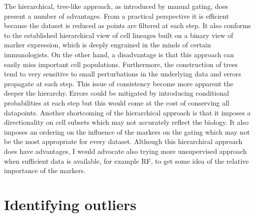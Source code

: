 The hierarchical, tree-like approach, as introduced by manual gating, does present a number of advantages.
From a practical perspective it is efficient because the dataset is reduced as points are filtered at each step.
It also conforms to the established hierarchical view of cell lineages built on a binary view of marker expression, which is deeply engrained in the minds of certain immunologists.
On the other hand, a disadvantage is that this approach can easily miss important cell populations.
Furthermore, the construction of trees tend to very sensitive to small perturbations in the underlying data and errors propagate at each step.
This issue of consistency become more apparent the deeper the hierarchy.
Errors could be mitigated by introducing conditional probabilities at each step but this would come at the cost of conserving all datapoints.
Another shortcoming of the hierarchical approach is that it imposes a directionality on cell subsets which may not accurately reflect the biology.
It also imposes an ordering on the influence of the markers on the gating which may not be the most appropriate for every dataset.
Although this hierarchical approach does have advantages, I would advocate also trying more unsupervised approach when sufficient data is available, for example \gls{RF}, to get some idea of the relative importance of the markers.


\section{ Identifying outliers }

